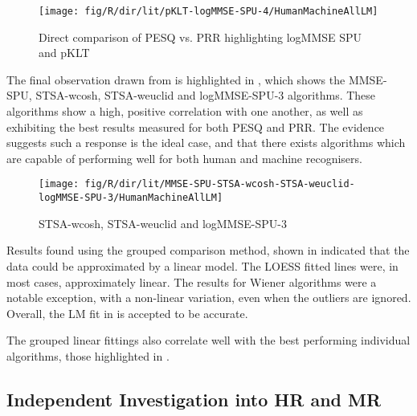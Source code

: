 \begin{figure}[p]
\noindent \begin{centering}
\texttt{[image: fig/R/dir/lit/pKLT-logMMSE-SPU-4/HumanMachineAllLM]}
\par\end{centering}

\protect\caption{\label{fig:direct-pklt-logmmse-spu-4}Direct comparison of \acs{PESQ}
vs. \acs{PRR} highlighting \acs{logMMSE} \acs{SPU} and \acs{pKLT}}
\end{figure}


The final observation drawn from  is highlighted
in , which shows the \ac{MMSE-SPU}, \ac{STSA-wcosh},
\ac{STSA-weuclid} and \ac{logMMSE-SPU-3} algorithms. These algorithms
show a high, positive correlation with one another, as well as exhibiting
the best results measured for both \ac{PESQ} and \ac{PRR}. The evidence
suggests such a response is the ideal case, and that there exists
algorithms which are capable of performing well for both human and
machine recognisers.

\begin{figure}[p]
\noindent \begin{centering}
\texttt{[image: fig/R/dir/lit/MMSE-SPU-STSA-wcosh-STSA-weuclid-logMMSE-SPU-3/HumanMachineAllLM]}
\par\end{centering}

\protect\caption{\label{fig:direct-highcorr}\acs{STSA-wcosh}, \acs{STSA-weuclid}
and \acs{logMMSE-SPU-3}}
\end{figure}


Results found using the grouped comparison method, shown in 
indicated that the data could be approximated by a linear model. The
\ac{LOESS} fitted lines were, in most cases, approximately linear.
The results for Wiener algorithms were a notable exception, with a
non-linear variation, even when the outliers are ignored. Overall,
the \ac{LM} fit in  is accepted to be
accurate.

The grouped linear fittings also correlate well with the best performing
individual algorithms, those highlighted in .


\subsection{Independent Investigation into \acl{HR} and \acl{MR}}

